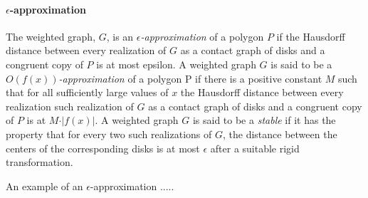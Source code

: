 \documentclass[10pt]{CSUNthesis}
\theoremstyle{plain}%
\theoremstyle{definition}
\theoremstyle{remark}
\newcommand{\BigOh}[1]{O\left( #1 \right)}
\begin{document}
\paragraph{$\epsilon$-approximation}
The weighted graph, $G$, is an \textit{$\epsilon$-approximation} of a polygon $P$ if the Hausdorff distance between every realization of $G$ as a contact graph of disks and a congruent copy of $P$ is at most epsilon.  
A weighted graph $G$ is said to be a \textit{$\BigOh{f(x)}$-approximation} of a polygon P if there is a positive constant $M$ such that for all sufficiently large values of $x$ the Hausdorff distance between every realization such realization of $G$ as a contact graph of disks and a congruent copy of $P$ is at $M \cdot \vert f(x)\vert$. 
A weighted graph $G$ is said to be a \textit{stable} if it has the property that for every two such realizations of $G$, the distance between the centers of the corresponding disks is at most $\epsilon$ after a suitable rigid transformation.

An example of an $\epsilon$-approximation .....
\end{document}
